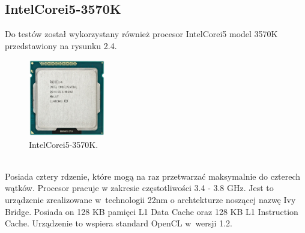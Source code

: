 \subsection{Intel\textregistered Core\texttrademark i5-3570K}
Do testów został wykorzystany również procesor Intel\textregistered Core\texttrademark i5 model 3570K przedstawiony na rysunku 2.4. 
\begin{figure}[h]
\centering
\includegraphics[width=0.3\textwidth]{figures/intel.jpg}
\caption{Intel\textregistered Core\texttrademark i5-3570K.\protect\footnotemark}%
\label{rys:Intel Core i5-3570K}
\end{figure}
\\Posiada cztery rdzenie, które mogą na raz przetwarzać maksymalnie do czterech wątków. Procesor pracuje w zakresie częstotliwości 3.4 - 3.8 GHz. Jest to urządzenie zrealizowane w~technologii 22nm o archtekturze noszącej nazwę Ivy Bridge. Posiada on 128 KB pamięci L1 Data Cache oraz 128 KB L1 Instruction Cache. Urządzenie to wspiera standard OpenCL w~wersji 1.2\cite{intel}.
